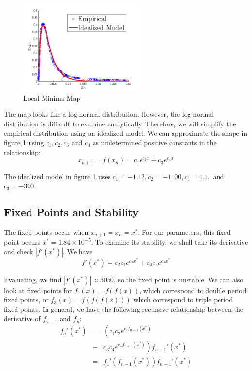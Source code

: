 \documentclass[12pt,journal,compsoc,twoside]{IEEEtran}
\begin{document}
\begin{figure}[h!]
\centering
\includegraphics[width = 2.5in, trim = 10 20 10 20]{map.png}
\caption{Local Minima Map}
\label{map}
\end{figure}

The map looks like a log-normal distribution. However, the log-normal distribution is difficult to examine analytically. Therefore, we will simplify the empirical distribution using an idealized model. We can approximate the shape in figure \ref{map} using $c_1, c_2, c_3$ and $c_4$ as undetermined positive constants in the relationship:
\begin{equation}
x_{n+1} = f(x_n) = c_1 e^{c_2 x} + c_3 e^{c_4 x}
\end{equation}

The idealized model in figure \ref{map} uses $c_1 = -1.12, c_2 = -1100, c_3 = 1.1,$ and $c_3 = -390$. 

\subsection{Fixed Points and Stability}

The fixed points occur when $x_{n+1} = x_{n} = x^{*}$. For our parameters, this fixed point occurs $x^{*} = 1.84 \times 10^{-5}$. To examine its stability, we shall take its derivative and check $|f'(x^{*})|$. We have
\begin{equation}
f'(x^{*}) = c_2 c_1 e^{c_2 x^*} + c_4 c_3 e^{c_4 x^*}
\end{equation}

Evaluating, we find $|f'(x^{*})| \approx 3050$, so the fixed point is unstable. We can also look at fixed points for $f_2(x) = f(f(x))$, which correspond to double period fixed points, or $f_3(x) = f(f(f(x)))$ which correspond to triple period fixed points. In general, we have the following recursive relationship between the derivative of $f_{n-1}$ and $f_{n}$:
\begin{eqnarray}
f_n'(x^{*}) &=& \left( c_1 c_2 e^{c_2 f_{n-1}(x^{*})} \right. \nonumber \\
&+& \left. c_3 c_4 e^{c_4 f_{n-1}(x^{*})} \right) f_{n-1}'(x^{*}) \nonumber \\ 
&=& f_1'(f_{n-1}(x^*)) f_{n-1}'(x^*) 
\label{eqn:recursion}
\end{eqnarray}
\end{document}
